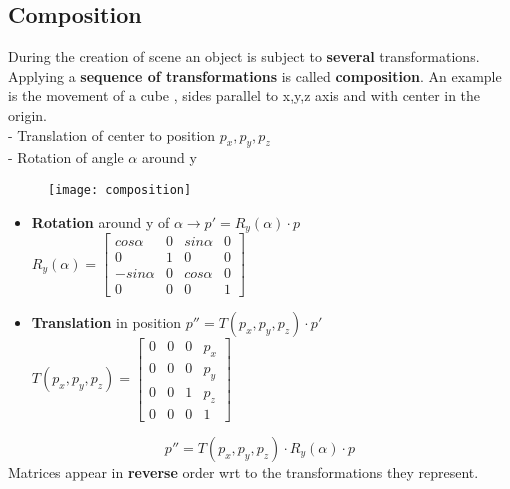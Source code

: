 \subsection{Composition}
During the creation of scene an object is subject to \textbf{several} transformations. Applying a \textbf{sequence of transformations} is called \textbf{composition}.
An example is the movement of a cube , sides parallel to x,y,z axis and with center in the origin.\\
- Translation of center to position $p_x,p_y,p_z$\\
- Rotation of angle $\alpha$ around y\\
\begin{figure}[H]
  \centering
  \texttt{[image: composition]}
\end{figure}
\begin{itemize}
\item \textbf{Rotation} around y of $\alpha \to p'=R_y(\alpha) \cdot p$\\
$	
R_y(\alpha)= \begin{bmatrix}
       cos\alpha & 0 & sin\alpha & 0        \\[0.1em]
       0 & 1 & 0 & 0		    \\[0.1em]
       -sin\alpha & 0 & cos\alpha & 0							\\[0.1em]
       0 & 0 & 0 & 1
     \end{bmatrix} 
$ 
\item \textbf{Translation} in position $p''=T(p_x,p_y,p_z) \cdot p'$\\
$	
T(p_x,p_y,p_z)= \begin{bmatrix}
       0 & 0 & 0 & p_x        \\[0.1em]
       0 & 0 & 0 & p_y	    \\[0.1em]
       0 & 0 & 1 & p_z							\\[0.1em]
       0 & 0 & 0 & 1
     \end{bmatrix} 
$
\end{itemize}
\[
\boxed{p''= T(p_x,p_y,p_z) \cdot R_y(\alpha) \cdot p}
\]
Matrices appear in \textbf{reverse} order wrt to the transformations they represent.



